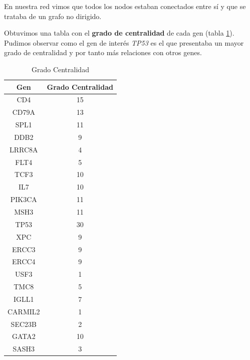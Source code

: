 En nuestra red vimos que todos los nodos estaban conectados entre sí y que se trataba de un grafo no dirigido.

\vspace{3pt}

Obtuvimos una tabla con el \textbf{grado de centralidad} de cada gen (tabla \ref{tab:gradoCentralidad}). Pudimos observar como el gen de interés \textit{TP53} es el que presentaba un mayor grado de centralidad y por tanto más relaciones con otros genes. 



	\begin{table}[h]
		\begin{minipage}{0.5\textwidth}
			\centering
			\begin{tabular}{|c|c|}
				\hline
				Gen & Grado Centralidad\\
				\hline
				CD4 & 15\\
				\hline
				CD79A & 13 \\
				\hline
				SPL1 & 11 \\
				\hline
				DDB2 & 9 \\
				\hline
				LRRC8A & 4 \\
				\hline
				FLT4 & 5 \\
				\hline
				TCF3 & 10 \\
				\hline
				IL7 & 10 \\
				\hline
				PIK3CA & 11 \\
				\hline
				MSH3 & 11 \\
				\hline
				TP53 & 30 \\
				\hline
				XPC & 9 \\
				\hline
				ERCC3 & 9 \\
				\hline
				ERCC4 & 9 \\
				\hline
				USF3 & 1 \\
				\hline
				TMC8 & 5 \\
				\hline
				IGLL1 & 7 \\
				\hline
				CARMIL2 & 1 \\
				\hline
				SEC23B & 2 \\
				\hline
				GATA2 & 10 \\
				\hline
				SASH3 & 3 \\
				\hline
			\end{tabular}
			\vspace{3pt}
			\caption{Grado Centralidad}
			\label{tab:gradoCentralidad}
		\end{minipage}%
		\begin{minipage}{0.5\textwidth}

\end{minipage}
\end{table}
